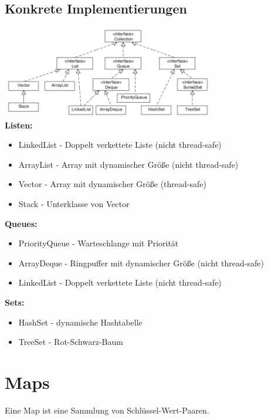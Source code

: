 \documentclass{scrreprt}
\begin{document}
\subsection{Konkrete Implementierungen}
\includegraphics[width=0.7\textwidth]{graphics/Collections}
\\\textbf{Listen:}
\begin{itemize}
  \item LinkedList - Doppelt verkettete Liste (nicht thread-safe)
  \item ArrayList - Array mit dynamischer Größe (nicht thread-safe)
  \item Vector - Array mit dynamischer Größe (thread-safe)
  \item Stack - Unterklasse von Vector
\end{itemize}
\textbf{Queues:}
\begin{itemize}
  \item PriorityQueue - Warteschlange mit Priorität
  \item ArrayDeque - Ringpuffer mit dynamischer Größe (nicht thread-safe)
  \item LinkedList - Doppelt verkettete Liste (nicht thread-safe)
\end{itemize}
\textbf{Sets:}
\begin{itemize}
  \item HashSet - dynamische Hashtabelle
  \item TreeSet - Rot-Schwarz-Baum 
\end{itemize}
\section{Maps}
Eine Map ist eine Sammlung von Schlüssel-Wert-Paaren.
\end{document}
